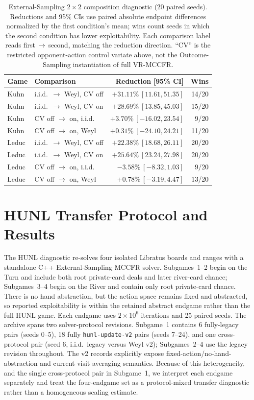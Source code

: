 \documentclass[11pt]{article}
\begin{document}
\begin{table}[h]
\centering
\small
\setlength{\tabcolsep}{4pt}
\caption{External-Sampling $2\times2$ composition diagnostic (20 paired seeds). Reductions and 95\% CIs use paired absolute endpoint differences normalized by the first condition's mean; wins count seeds in which the second condition has lower exploitability. Each comparison label reads first$\,\to\,$second, matching the reduction direction. ``CV'' is the restricted opponent-action control variate above, not the Outcome-Sampling instantiation of full VR-MCCFR.}
\label{tab:es-control-variate}
\begin{tabular}{llrr}
\toprule
Game & Comparison & Reduction [95\% CI] & Wins \\
\midrule
Kuhn & i.i.d.\ $\to$ Weyl, CV off & $+31.11\%\ [11.61,51.35]$ & 14/20 \\
Kuhn & i.i.d.\ $\to$ Weyl, CV on  & $+28.69\%\ [13.85,45.03]$ & 15/20 \\
Kuhn & CV off $\to$ on, i.i.d.\   & $+3.70\%\ [-16.02,23.54]$ & 9/20 \\
Kuhn & CV off $\to$ on, Weyl      & $+0.31\%\ [-24.10,24.21]$ & 11/20 \\
\midrule
Leduc & i.i.d.\ $\to$ Weyl, CV off & $+22.38\%\ [18.68,26.11]$ & 20/20 \\
Leduc & i.i.d.\ $\to$ Weyl, CV on  & $+25.64\%\ [23.24,27.98]$ & 20/20 \\
Leduc & CV off $\to$ on, i.i.d.\   & $-3.58\%\ [-8.32,1.03]$ & 9/20 \\
Leduc & CV off $\to$ on, Weyl      & $+0.78\%\ [-3.19,4.47]$ & 13/20 \\
\bottomrule
\end{tabular}
\end{table}

\section{HUNL Transfer Protocol and Results}
\label{app:hunl-details}

The HUNL diagnostic re-solves four isolated Libratus boards and ranges with a standalone C++ External-Sampling MCCFR solver. Subgames~1--2 begin on the Turn and include both root private-card deals and later river-card chance; Subgames~3--4 begin on the River and contain only root private-card chance. There is no hand abstraction, but the action space remains fixed and abstracted, so reported exploitability is within the retained abstract endgame rather than the full HUNL game. Each endgame uses $2\times10^6$ iterations and 25 paired seeds. The archive spans two solver-protocol revisions. Subgame~1 contains 6 fully-legacy pairs (seeds 0--5), 18 fully \texttt{hunl-update-v2} pairs (seeds 7--24), and one cross-protocol pair (seed 6, i.i.d.\ legacy versus Weyl v2); Subgames~2--4 use the legacy revision throughout. The v2 records explicitly expose fixed-action/no-hand-abstraction and current-visit averaging semantics. Because of this heterogeneity, and the single cross-protocol pair in Subgame~1, we interpret each endgame separately and treat the four-endgame set as a protocol-mixed transfer diagnostic rather than a homogeneous scaling estimate.
\end{document}
